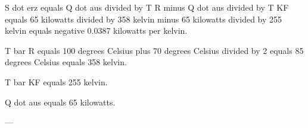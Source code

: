 S dot erz equals Q dot aus divided by T R minus Q dot aus divided by T KF equals 65 kilowatts divided by 358 kelvin minus 65 kilowatts divided by 255 kelvin equals negative 0.0387 kilowatts per kelvin.  

T bar R equals 100 degrees Celsius plus 70 degrees Celsius divided by 2 equals 85 degrees Celsius equals 358 kelvin.  

T bar KF equals 255 kelvin.  

Q dot aus equals 65 kilowatts.  

---